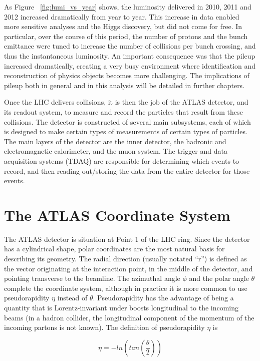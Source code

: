 As Figure ~\ref{fig:lumi_vs_year} shows, the luminosity delivered in 2010, 2011 and 2012 increased dramatically from year to year.  This increase in data enabled more sensitive analyses and the Higgs discovery, but did not come for free.  In particular, over the course of this period, the number of protons and the bunch emittance were tuned to increase the number of collisions per bunch crossing, and thus the instantaneous luminosity.  An important consequence was that the pileup increased dramatically, creating a very busy environment where identification and reconstruction of physics objects becomes more challenging.  The implications of pileup both in general and in this analysis will be detailed in further chapters.


Once the LHC delivers collisions, it is then the job of the ATLAS detector, and its readout system, to measure and record the particles that result from these collisions.  The detector is constructed of several main subsystems, each of which is designed to make certain types of measurements of certain types of particles.  The main layers of the detector are the inner detector, the hadronic and electromagnetic calorimeter, and the muon system.  The trigger and data acquisition systems (TDAQ) are responsible for determining which events to record, and then reading out/storing the data from the entire detector for those events.


\section{The ATLAS Coordinate System}
The ATLAS detector is situation at Point 1 of the LHC ring.  Since the detector has a cylindrical shape, polar coordinates are the most natural basis for describing its geometry.  The radial direction (usually notated ``r'') is defined as the vector originating at the interaction point, in the middle of the detector, and pointing transverse to the beamline.  The azimuthal angle $\phi$ and the polar angle $\theta$ complete the coordinate system, although in practice it is more common to use pseudorapidity $\eta$ instead of $\theta$.  Pseudorapidity has the advantage of being a quantity that is Lorentz-invariant under boosts longitudinal to the incoming beams (in a hadron collider, the longitudinal component of the momentum of the incoming partons is not known).  The definition of pseudorapidity $\eta$ is

\begin{equation}
\eta = -ln(tan( \frac{\theta}{2} ))
\end{equation}

